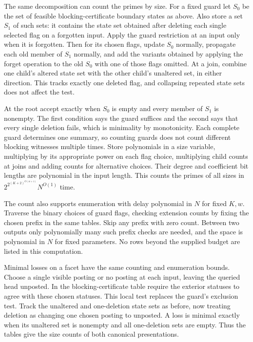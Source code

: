 The same decomposition can count the primes by size.
For a fixed guard let $S_0$ be the set of feasible
blocking-certificate boundary states as above. Also
store a set $S_1$ of such sets: it contains the state
set obtained after deleting each single selected flag
on a forgotten input. Apply the guard restriction at
an input only when it is forgotten. Then for its
chosen flags, update $S_0$ normally, propagate each
old member of $S_1$ normally, and add the variants
obtained by applying the forget operation to the old
$S_0$ with one of those flags omitted. At a join,
combine one child's altered state set with the other
child's unaltered set, in either direction. This tracks
exactly one deleted flag, and collapsing repeated
state sets does not affect the test.

At the root accept exactly when $S_0$ is empty and
every member of $S_1$ is nonempty. The first condition
says the guard suffices and the second says that every
single deletion fails, which is minimality by
monotonicity. Each complete guard determines one
summary, so counting guards does not count different
blocking witnesses multiple times. Store polynomials
in a size variable, multiplying by its appropriate
power on each flag choice, multiplying child counts
at joins and adding counts for alternative choices.
Their degree and coefficient bit lengths are
polynomial in the input length. This counts the primes
of all sizes in $2^{2^{(K+2)^{O(w+1)}}}N^{O(1)}$ time.

The count also supports enumeration with delay
polynomial in $N$ for fixed $K,w$. Traverse the
binary choices of guard flags, checking extension
counts by fixing the chosen prefix in the same
tables. Skip any prefix with zero count. Between
two outputs only polynomially many such prefix
checks are needed, and the space is polynomial in
$N$ for fixed parameters. No rows beyond the
supplied budget are listed in this computation.

Minimal losses on a facet have the same counting and
enumeration bounds. Choose a single visible posting
or no posting at each input, leaving the queried head
unposted. In the blocking-certificate table require
the exterior statuses to agree with these chosen
statuses. This local test replaces the guard's
exclusion test. Track the unaltered and one-deletion
state sets as before, now treating deletion as changing
one chosen posting to unposted. A loss is minimal
exactly when its unaltered set is nonempty and all
one-deletion sets are empty. Thus the tables give the
size counts of both canonical presentations.

